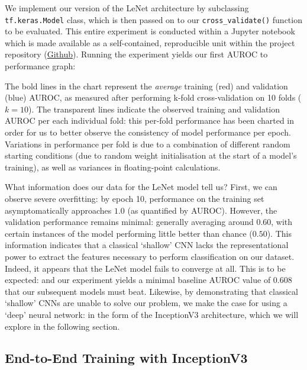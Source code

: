 \noindent
We implement our version of the LeNet architecture by subclassing \texttt{tf.keras.Model} class, which is then passed on to our \texttt{cross_validate()} function to be evaluated. This entire experiment is conducted within a Jupyter notebook which is made available as a self-contained, reproducible unit within the project repository (\href{https://github.com/ShenZhouHong/radiography-ai-project/blob/master/python/initial-evaluation/lenet1998.ipynb}{Github}). Running the experiment yields our first AUROC to performance graph:



\noindent 
The bold lines in the chart represent the \emph{average} training (red) and validation (blue) AUROC, as measured after performing k-fold cross-validation on 10 folds (\(k = 10\)). The transparent lines indicate the observed training and validation AUROC per each individual fold: this per-fold performance has been charted in order for us to better observe the consistency of model performance per epoch. Variations in performance per fold is due to a combination of different random starting conditions (due to random weight initialisation at the start of a model's training), as well as variances in floating-point calculations.

What information does our data for the LeNet model tell us? First, we can observe severe overfitting: by epoch 10, performance on the training set asymptomatically approaches $1.0$ (as quantified by AUROC). However, the validation performance remains minimal: generally averaging around $0.60$, with certain instances of the model performing little better than chance ($0.50$). This information indicates that a classical \enquote*{shallow} CNN lacks the representational power to extract the features necessary to perform classification on our dataset. Indeed, it appears that the LeNet model fails to converge at all. This is to be expected: and our experiment yields a minimal baseline AUROC value of $0.608$ that our subsequent models must beat. Likewise, by demonstrating that classical \enquote*{shallow} CNNs are unable to solve our problem, we make the case for using a \enquote*{deep} neural network: in the form of the InceptionV3 architecture, which we will explore in the following section.

\subsection{End-to-End Training with InceptionV3}

